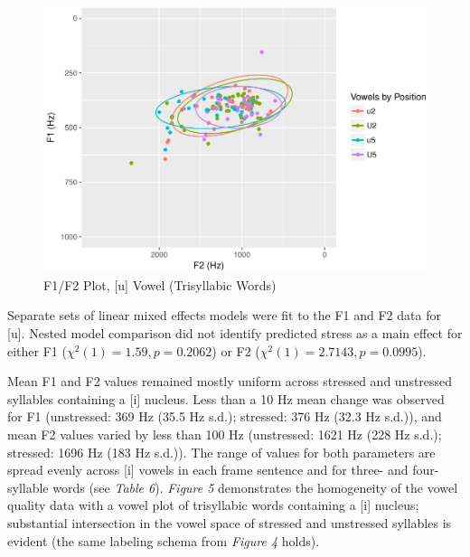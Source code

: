 \documentclass[english,man]{apa6}
\theoremstyle{definition}
\theoremstyle{definition}
\theoremstyle{definition}
\theoremstyle{remark}
\begin{document}
\begin{figure}
\centering
\includegraphics{lithuanian_article_files/figure-latex/Figure4-1.pdf}
\caption{\label{fig:Figure4}F1/F2 Plot, {[}u{]} Vowel (Trisyllabic Words)}
\end{figure}

Separate sets of linear mixed effects models were fit to the F1 and F2
data for {[}u{]}. Nested model comparison did not identify predicted
stress as a main effect for either F1 (\(\chi^2(1) = 1.59, p = 0.2062\))
or F2 (\(\chi^2(1) = 2.7143, p = 0.0995\)).

Mean F1 and F2 values remained mostly uniform across stressed and
unstressed syllables containing a {[}i{]} nucleus. Less than a 10 Hz
mean change was observed for F1 (unstressed: 369 Hz (35.5 Hz s.d.);
stressed: 376 Hz (32.3 Hz s.d.)), and mean F2 values varied by less than
100 Hz (unstressed: 1621 Hz (228 Hz s.d.); stressed: 1696 Hz (183 Hz
s.d.)). The range of values for both parameters are spread evenly across
{[}i{]} vowels in each frame sentence and for three- and four-syllable
words (see \textit{Table 6}). \textit{Figure 5} demonstrates the
homogeneity of the vowel quality data with a vowel plot of trisyllabic
words containing a {[}i{]} nucleus; substantial intersection in the
vowel space of stressed and unstressed syllables is evident (the same
labeling schema from \textit{Figure 4} holds).
\end{document}
